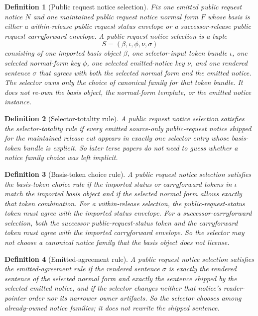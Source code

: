 \documentclass[11pt]{article}
\newtheorem{definition}{Definition}
\begin{document}
\begin{definition}[Public request notice selection]
Fix one emitted public request notice $N$ and one maintained public request notice normal form $F$ whose basis is either a within-release public request status envelope or a successor-release public request carryforward envelope.
A \emph{public request notice selection} is a tuple
\[
S=(\beta,\iota,\phi,\nu,\sigma)
\]
consisting of one imported basis object $\beta$, one selector-input token bundle $\iota$, one selected normal-form key $\phi$, one selected emitted-notice key $\nu$, and one rendered sentence $\sigma$ that agrees with both the selected normal form and the emitted notice.
The selector owns only the choice of canonical family for that token bundle.
It does not re-own the basis object, the normal-form template, or the emitted notice instance.
\end{definition}

\begin{definition}[Selector-totality rule]
A public request notice selection satisfies the \emph{selector-totality rule} if every emitted source-only public-request notice shipped for the maintained release cut appears in exactly one selector entry whose basis-token bundle is explicit.
So later terse papers do not need to guess whether a notice family choice was left implicit.
\end{definition}

\begin{definition}[Basis-token choice rule]
A public request notice selection satisfies the \emph{basis-token choice rule} if the imported status or carryforward tokens in $\iota$ match the imported basis object and if the selected normal form allows exactly that token combination.
For a within-release selection, the public-request-status token must agree with the imported status envelope.
For a successor-carryforward selection, both the successor public-request-status token and the carryforward token must agree with the imported carryforward envelope.
So the selector may not choose a canonical notice family that the basis object does not license.
\end{definition}

\begin{definition}[Emitted-agreement rule]
A public request notice selection satisfies the \emph{emitted-agreement rule} if the rendered sentence $\sigma$ is exactly the rendered sentence of the selected normal form and exactly the sentence shipped by the selected emitted notice, and if the selector changes neither that notice's reader-pointer order nor its narrower owner artifacts.
So the selector chooses among already-owned notice families; it does not rewrite the shipped sentence.
\end{definition}
\end{document}
